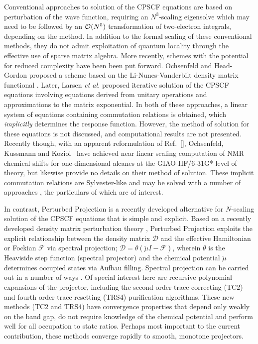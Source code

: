 \documentclass[prl,twocolumn,showpacs,twocolumngrid,superbib]{revtex4}
\begin{document}
Conventional approaches to solution of the CPSCF equations 
\cite{HSekino86,SKarna91,JPople79} are based on perturbation of the wave 
function, requiring an $N^3$-scaling eigensolve which may need to be followed by an ${\cal O}(N^5)$ 
transformation of two-electron integrals, depending on the method. 
In addition to the formal scaling of these conventional methods, they do not admit exploitation 
of quantum locality through the effective use of sparse matrix algebra.  
More recently, schemes with the potential for reduced complexity have been been put forward.
Ochsenfeld and Head-Gordon proposed a scheme based on the Li-Nunes-Vanderbilt 
density matrix functional \cite{Ochsenfeld97}.  Later, Larsen {\em et al.} \cite{HLarsen01a} 
proposed iterative solution of the CPSCF equations involving equations derived from 
unitary operations and approximations to the matrix exponential.    In both of these approaches, 
a linear system of equations containing commutation relations is obtained, which {\em implicitly}
determines the response function.  However, the method of solution for these equations
is not discussed, and computational results are not presented.  Recently though, 
with an apparent reformulation of Ref.~[],
Ochsenfeld, Kussmann and Koziol~\cite{COchsenfeld04} have achieved near linear scaling computation
of NMR chemical shifts for one-dimensional alcanes at the GIAO-HF/6-31G* level of theory,
but likewise provide no details on their method of solution.  These implicit commutation relations are Sylvester-like
and may be solved with a number of approaches \cite{JBrandts01}, the particulars of which are of interest. 

In contrast, Perturbed Projection \cite{VWeber04} is a recently developed alternative 
for $N$-scaling solution of the CPSCF equations that is simple and explicit.  Based on a recently developed density 
matrix perturbation theory \cite{ANiklasson04}, Perturbed Projection exploits the explicit 
relationship between the density matrix $\mathcal{D}$ and the effective Hamiltonian or 
Fockian $\mathcal{F}$ via spectral projection; $\mathcal{D}=\theta(\tilde{\mu}I-\mathcal{F})$, 
wherein $\theta$ is the Heaviside step function (spectral projector)  and the chemical potential 
$\tilde{\mu}$ determines occupied states via Aufbau filling.   Spectral projection can be carried 
out in a number of ways \cite{ANiklasson02A,ANiklasson03,RMcWeeny60,WClinton69,APalser98,GBeylkin99,KNemeth00,AHolas01}.
Of special interest here are recursive polynomial expansions of the projector, including the second 
order trace correcting (TC2) \cite{ANiklasson02A} and fourth order trace resetting (TRS4) 
\cite{ANiklasson03} purification algorithms.  These new methods (TC2 and TRS4) have convergence 
properties that depend only weakly on the band gap, do not require knowledge of the chemical potential 
and perform well for all occupation to state ratios. 
Perhaps most important to the current contribution, these methods converge rapidly to smooth, 
monotone projectors.
\end{document}
